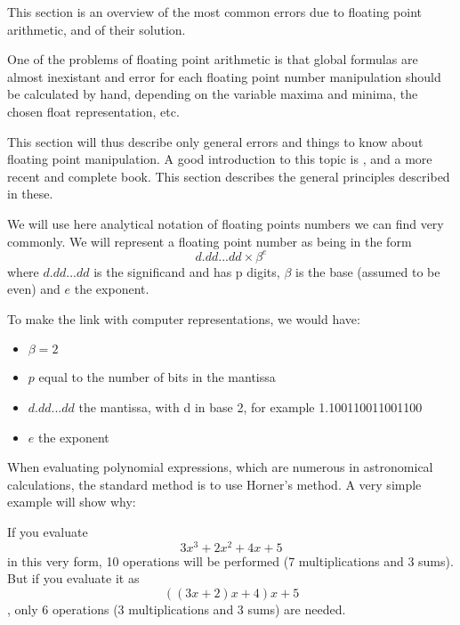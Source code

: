 

This section is an overview of the most common errors due to floating point arithmetic, and of their solution.


One of the problems of floating point arithmetic is that global formulas are almost inexistant and error for each floating point number manipulation should be calculated by hand, depending on the variable maxima and minima, the chosen float representation, etc.

This section will thus describe only general errors and things to know about floating point manipulation. A good introduction to this topic is \cite{Goldberg}, and \cite{Higham} a more recent and complete book. This section describes the general principles described in these.


We will use here analytical notation of floating points numbers we can find very commonly. We will represent a floating point number as being in the form $$d.dd...dd\times\beta^e$$where $d.dd...dd$ is the significand and has p digits, $\beta$ is the base (assumed to be even) and $e$ the exponent.

To make the link with computer representations, we would have:
\begin{itemize}
\item $\beta=2$
\item $p$ equal to the number of bits in the mantissa
\item $d.dd...dd$ the mantissa, with d in base 2, for example 1.100110011001100
\item $e$ the exponent
\end{itemize}



When evaluating polynomial expressions, which are numerous in astronomical calculations, the standard method is to use Horner's method. A very simple example will show why:

If you evaluate $$3x^3 + 2x^2 + 4x + 5$$ in this very form, 10 operations will be performed (7 multiplications and 3 sums). But if you evaluate it as $$((3x + 2)x + 4)x + 5$$, only 6 operations (3 multiplications and 3 sums) are needed.

